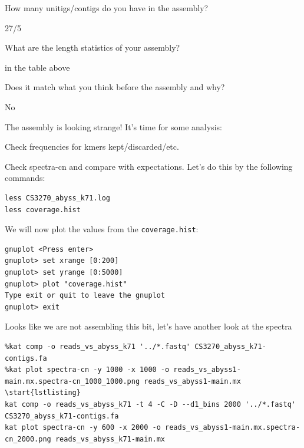 \begin{questions}
How many unitigs/contigs do you have in the assembly? \\
\begin{answer}
27/5 \\
\end{answer}
What are the length statistics of your assembly? \\
\begin{answer}
in the table above \\
\end{answer}
Does it match what you think before the assembly and why? \\
\begin{answer}
No \\
\end{answer}

\end{questions}


\begin{steps}
The assembly is looking strange! It's time for some analysis:

\item Check frequencies for kmers kept/discarded/etc.
\item Check spectra-cn and compare with expectations.
Let's do this by the following commands:

\begin{lstlisting}
less CS3270_abyss_k71.log 
less coverage.hist
\end{lstlisting}
\end{steps}

\begin{steps}
We will now plot the values from the \texttt{coverage.hist}:
\begin{lstlisting}
gnuplot <Press enter>
gnuplot> set xrange [0:200]
gnuplot> set yrange [0:5000]
gnuplot> plot "coverage.hist"
Type exit or quit to leave the gnuplot
gnuplot> exit
\end{lstlisting}
\end{steps}


\begin{steps}
Looks like we are not assembling this bit, let's have another look at the spectra
\begin{lstlisting}
%kat comp -o reads_vs_abyss_k71 '../*.fastq' CS3270_abyss_k71-contigs.fa
%kat plot spectra-cn -y 1000 -x 1000 -o reads_vs_abyss1-main.mx.spectra-cn_1000_1000.png reads_vs_abyss1-main.mx
\start{lstlisting}
kat comp -o reads_vs_abyss_k71 -t 4 -C -D --d1_bins 2000 '../*.fastq' CS3270_abyss_k71-contigs.fa
kat plot spectra-cn -y 600 -x 2000 -o reads_vs_abyss1-main.mx.spectra-cn_2000.png reads_vs_abyss_k71-main.mx

\end{lstlisting}
\end{steps}

